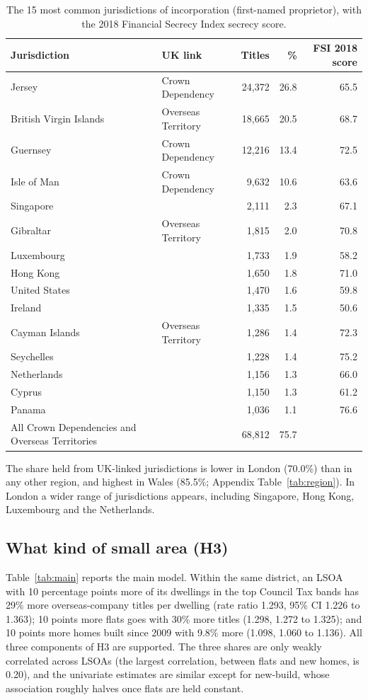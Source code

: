 \documentclass[11pt,a4paper]{article}
\begin{document}
\begin{table}[tbp]\centering\small\caption{The 15 most common jurisdictions of incorporation (first-named proprietor), with the 2018 Financial Secrecy Index secrecy score.}\label{tab:jur}\begin{tabular}{llrrr}\toprule Jurisdiction & UK link & Titles & \% & FSI 2018 score\\\midrule
Jersey & Crown Dependency & 24,372 & 26.8 & 65.5\\
British Virgin Islands & Overseas Territory & 18,665 & 20.5 & 68.7\\
Guernsey & Crown Dependency & 12,216 & 13.4 & 72.5\\
Isle of Man & Crown Dependency & 9,632 & 10.6 & 63.6\\
Singapore &  & 2,111 & 2.3 & 67.1\\
Gibraltar & Overseas Territory & 1,815 & 2.0 & 70.8\\
Luxembourg &  & 1,733 & 1.9 & 58.2\\
Hong Kong &  & 1,650 & 1.8 & 71.0\\
United States &  & 1,470 & 1.6 & 59.8\\
Ireland &  & 1,335 & 1.5 & 50.6\\
Cayman Islands & Overseas Territory & 1,286 & 1.4 & 72.3\\
Seychelles &  & 1,228 & 1.4 & 75.2\\
Netherlands &  & 1,156 & 1.3 & 66.0\\
Cyprus &  & 1,150 & 1.3 & 61.2\\
Panama &  & 1,036 & 1.1 & 76.6\\
\midrule All Crown Dependencies and Overseas Territories & & 68,812 & 75.7 & \\
\bottomrule\end{tabular}\end{table}

The share held from UK-linked jurisdictions is lower in London (70.0\%) than in any other region, and highest in Wales (85.5\%; Appendix Table~\ref{tab:region}). In London a wider range of jurisdictions appears, including Singapore, Hong Kong, Luxembourg and the Netherlands.

\subsection{What kind of small area (H3)}
Table~\ref{tab:main} reports the main model. Within the same district, an LSOA with 10 percentage points more of its dwellings in the top Council Tax bands has 29\% more overseas-company titles per dwelling (rate ratio 1.293, 95\% CI 1.226 to 1.363); 10 points more flats goes with 30\% more titles (1.298, 1.272 to 1.325); and 10 points more homes built since 2009 with 9.8\% more (1.098, 1.060 to 1.136). All three components of H3 are supported. The three shares are only weakly correlated across LSOAs (the largest correlation, between flats and new homes, is 0.20), and the univariate estimates are similar except for new-build, whose association roughly halves once flats are held constant.
\end{document}
